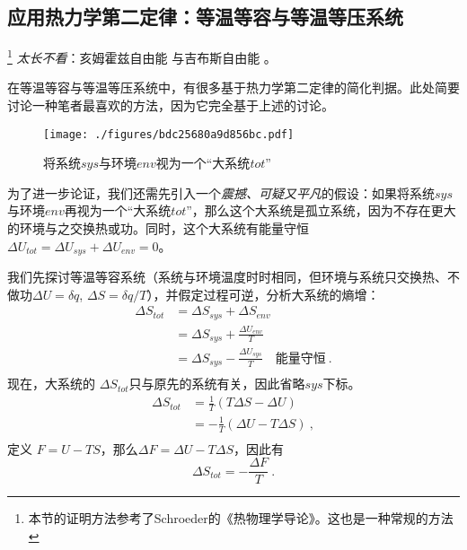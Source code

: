 \subsection{应用热力学第二定律：等温等容与等温等压系统}
\footnote{本节的证明方法参考了Schroeder的《热物理学导论》。这也是一种常规的方法} 
\textsl{太长不看}：亥姆霍兹自由能 与吉布斯自由能 。

在等温等容与等温等压系统中，有很多基于热力学第二定律的简化判据。此处简要讨论一种笔者最喜欢的方法，因为它完全基于上述的讨论。

\begin{figure}[ht]
\centering
\texttt{[image: ./figures/bdc25680a9d856bc.pdf]}
\caption{将系统$sys$与环境$env$视为一个“大系统$tot$”} \label{fig_Td2Law_3}
\end{figure}

为了进一步论证，我们还需先引入一个\textsl{震撼、可疑又平凡}的假设：如果将系统$sys$与环境$env$再视为一个“大系统$tot$”，那么这个大系统是孤立系统，因为不存在更大的环境与之交换热或功。同时，这个大系统有能量守恒 $\Delta U_{tot} = \Delta U_{sys} + \Delta U_{env} = 0$。

我们先探讨等温等容系统（系统与环境温度时时相同，但环境与系统只交换热、不做功$\Delta U = \delta q$, $\Delta S = \delta q / T$），并假定过程可逆，分析大系统的熵增：
\begin{equation}
\begin{aligned}
\Delta {S_{tot}}
 &=\Delta {S_{sys}}+\Delta {S_{env}}\\
 & =\Delta {S_{sys}}+ \frac{\Delta U_{{env}}}{T}\\
 & = \Delta {S_{sys}} - \frac{\Delta U_{{sys}}}{T} \quad \text{能量守恒}~.\\
 \end{aligned}
\end{equation}
现在，大系统的 $\Delta {S_{tot}}$只与原先的系统有关，因此省略$sys$下标。
\begin{equation}
\begin{aligned}
\Delta {S_{tot}}
 & = \frac{1}{T}(T \Delta {S} -\Delta U )\\
 & = - \frac{1}{T}(\Delta U - T \Delta {S} )~,\\
\end{aligned}
\end{equation}
定义 $F = U-TS$，那么$\Delta F = \Delta U - T \Delta S$，因此有
\begin{equation}
\Delta S_{tot} = -\frac{\Delta F}{T}~.
\end{equation}

